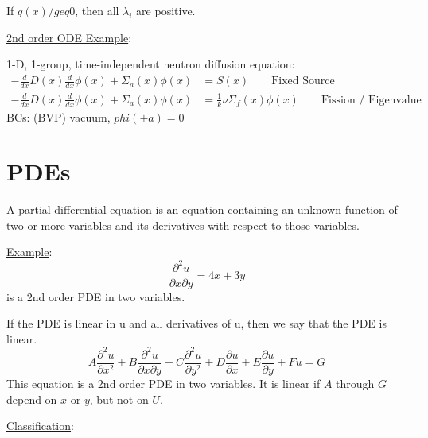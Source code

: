 \documentclass[12pt]{article}
\newcommand{\Macro}{\ensuremath{\Sigma}}
\begin{document}
If $q(x) /geq 0$, then all $\lambda_i$ are positive.

\vspace*{1em}
\noindent \underline{2nd order ODE Example}:

1-D, 1-group, time-independent neutron diffusion equation:
%
\begin{align}
-\frac{d}{dx}D(x)\frac{d}{dx}\phi(x) + \Macro_a(x)\phi(x) &= S(x) \qquad \text{Fixed Source} \nonumber \\
-\frac{d}{dx}D(x)\frac{d}{dx}\phi(x) + \Macro_a(x)\phi(x) &= \frac{1}{k} \nu \Macro_f(x) \phi(x)\qquad \text{Fission / Eigenvalue} \nonumber
\end{align}
%
BCs: (BVP) vacuum, $phi(\pm a) = 0$

\section{PDEs}

A partial differential equation is an equation containing an unknown function of two or more variables and its derivatives with respect to those variables. 

\vspace*{1em}
\noindent \underline{Example}:
%
\begin{equation}
\frac{\partial^2 u}{\partial x \partial  y} = 4x + 3y \nonumber
\end{equation}
%
is a 2nd order PDE in two variables. 

If the PDE is linear in u and all derivatives of u, then we say that the PDE is linear.
%
\begin{equation}
A\frac{\partial^2 u}{\partial x^2} + B\frac{\partial^2 u}{\partial x \partial  y} + C\frac{\partial^2 u}{\partial y^2} + D\frac{\partial u}{\partial x} + E\frac{\partial u}{\partial y} + Fu = G \nonumber
\end{equation}
%
This equation is a 2nd order PDE in two variables. It is linear if $A$ through $G$ depend on $x$ or $y$, but not on $U$.

\vspace*{1em}
\noindent \underline{Classification}:
\end{document}

